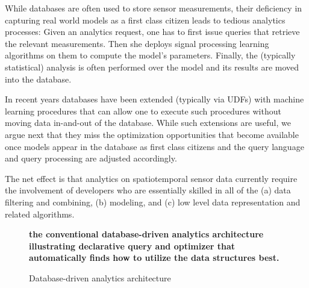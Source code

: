 
While databases are often used to store sensor measurements, their deficiency in capturing real world models as a first class citizen leads to tedious analytics processes: Given an analytics request, one has to first issue queries that retrieve the relevant measurements. Then she deploys signal processing learning algorithms on them to compute the model's parameters. Finally,  the (typically statistical) analysis is often performed over the model and its results are moved into the database.

In recent years databases have been extended (typically via UDFs) with machine learning procedures that can allow one to execute such procedures without moving data in-and-out of the database. While such extensions are useful, we argue next that they miss the optimization opportunities that become available once models appear in the database as first class citizens and the query language and query processing are adjusted accordingly.

The net effect is that analytics on spatiotemporal sensor data currently require the involvement of developers who are essentially skilled in all of the (a) data filtering and combining, (b) modeling, and (c) low level data representation and related algorithms. 


\begin{figure}
{\bf the conventional database-driven analytics architecture illustrating declarative query and optimizer that automatically finds how to utilize the data structures best.}
\caption{Database-driven analytics architecture}
\label{fig:db-driven-arch}
\end{figure}


